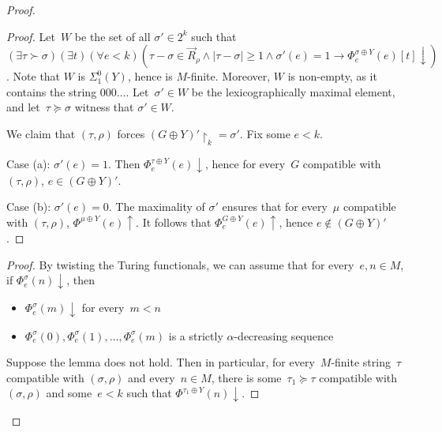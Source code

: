 \documentclass{article}
\numberwithin{theorem}{section}
\newtheorem{lemma}[theorem]{Lemma}
\newcommand{\uh}[0]{{\upharpoonright}}
\begin{document}
\begin{proof}
\begin{proof}
Let~$W$ be the set of all $\sigma' \in 2^k$ such that $(\exists \tau \succ \sigma)(\exists t)(\forall e < k)(\tau - \sigma \in \vec{R}_\rho \wedge |\tau - \sigma| \geq 1 \wedge \sigma'(e) = 1 \to \Phi_e^{\sigma \oplus Y}(e)[t] \downarrow)$.
Note that $W$ is $\Sigma^0_1(Y)$, hence is $M$-finite. Moreover, $W$ is non-empty, as it contains the string $000\dots$. Let~$\sigma' \in W$ be the lexicographically maximal element, and let~$\tau \succeq \sigma$ witness that $\sigma' \in W$.

We claim that $(\tau, \rho)$ forces $(G \oplus Y)' \uh_k = \sigma'$.
Fix some $e < k$.

Case (a): $\sigma'(e) = 1$. Then $\Phi_e^{\tau \oplus Y}(e)\downarrow$, hence for every~$G$ compatible with $(\tau, \rho)$, $e \in (G \oplus Y)'$.

Case (b): $\sigma'(e) = 0$. The maximality of $\sigma'$ ensures that for every~$\mu$ compatible with $(\tau, \rho)$, $\Phi^{\mu \oplus Y}(e)\uparrow$. It follows that $\Phi^{G \oplus Y}_e(e)\uparrow$, hence $e \not \in (G \oplus Y)'$.
\end{proof}

\begin{proof}
By twisting the Turing functionals, we can assume that for every~$e, n \in M$, if $\Phi^\sigma_e(n)\downarrow$, then
\begin{itemize}
    \item $\Phi^\sigma_e(m)\downarrow$ for every~$m < n$
    \item $\Phi^\sigma_e(0), \Phi^\sigma_e(1), \dots, \Phi^\sigma_e(m)$ is a strictly $\alpha$-decreasing sequence
\end{itemize}

Suppose the lemma does not hold. Then in particular, for every~$M$-finite string~$\tau$ compatible with $(\sigma, \rho)$ and every~$n \in M$, there is some~$\tau_1 \succeq \tau$ compatible with~$(\sigma, \rho)$ and some~$e < k$ such that $\Phi^{\tau_1 \oplus Y}(n)\downarrow$.


\end{proof}
\end{proof}
\end{document}
